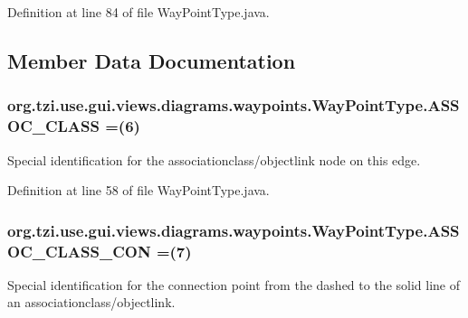 Definition at line 84 of file Way\-Point\-Type.\-java.



\subsection{Member Data Documentation}
\hypertarget{enumorg_1_1tzi_1_1use_1_1gui_1_1views_1_1diagrams_1_1waypoints_1_1_way_point_type_a0ff7750ac342b5fbdabcfabea076ad4c}{
\subsubsection[{A\-S\-S\-O\-C\-\_\-\-C\-L\-A\-S\-S}]{\setlength{\rightskip}{0pt plus 5cm}org.\-tzi.\-use.\-gui.\-views.\-diagrams.\-waypoints.\-Way\-Point\-Type.\-A\-S\-S\-O\-C\-\_\-\-C\-L\-A\-S\-S =(6)}}\label{enumorg_1_1tzi_1_1use_1_1gui_1_1views_1_1diagrams_1_1waypoints_1_1_way_point_type_a0ff7750ac342b5fbdabcfabea076ad4c}
Special identification for the associationclass/objectlink node on this edge. 

Definition at line 58 of file Way\-Point\-Type.\-java.

\hypertarget{enumorg_1_1tzi_1_1use_1_1gui_1_1views_1_1diagrams_1_1waypoints_1_1_way_point_type_ae84bcf38fc6ae9e1a3bbde33f723a797}{
\subsubsection[{A\-S\-S\-O\-C\-\_\-\-C\-L\-A\-S\-S\-\_\-\-C\-O\-N}]{\setlength{\rightskip}{0pt plus 5cm}org.\-tzi.\-use.\-gui.\-views.\-diagrams.\-waypoints.\-Way\-Point\-Type.\-A\-S\-S\-O\-C\-\_\-\-C\-L\-A\-S\-S\-\_\-\-C\-O\-N =(7)}}\label{enumorg_1_1tzi_1_1use_1_1gui_1_1views_1_1diagrams_1_1waypoints_1_1_way_point_type_ae84bcf38fc6ae9e1a3bbde33f723a797}
Special identification for the connection point from the dashed to the solid line of an associationclass/objectlink. 


